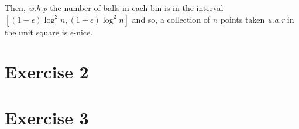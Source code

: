 \documentclass[12pt, a4paper]{article} %
\begin{document}
Then, \textit{w.h.p} the number of balls in each bin is in the interval ${[(1-\epsilon) \log^{2}n, (1 + \epsilon)\log^{2}n]}$ and so, a collection of $n$ points taken \textit{u.a.r} in the unit square is $\epsilon$-nice.


\section*{Exercise 2}%
\label{sec:exercise_2}


\section*{Exercise 3}%
\label{sec:exercise_3}


% 
\end{document}
